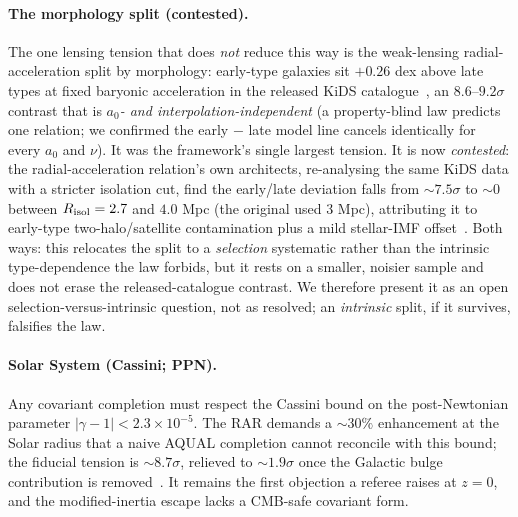 \documentclass[aps,prd,twocolumn,10pt,nofootinbib,superscriptaddress]{revtex4-2}
\begin{document}
\paragraph{The morphology split (contested).} The one lensing tension that does \emph{not} reduce this way is the
weak-lensing radial-acceleration split by morphology: early-type galaxies sit $+0.26$ dex above late types at fixed
baryonic acceleration in the released KiDS catalogue~\cite{Brouwer2021}, an $8.6$--$9.2\sigma$ contrast that is
\emph{$a_0$- and interpolation-independent} (a property-blind law predicts one relation; we confirmed the early
$-$ late model line cancels identically for every $a_0$ and $\nu$). It was the framework's single largest tension.
It is now \emph{contested}: the radial-acceleration relation's own architects, re-analysing the same KiDS data with
a stricter isolation cut, find the early/late deviation falls from $\sim7.5\sigma$ to $\sim0$ between $R_{\rm
isol}=2.7$ and $4.0$ Mpc (the original used $3$ Mpc), attributing it to early-type two-halo/satellite
contamination plus a mild stellar-IMF offset~\cite{Mistele2024}. Both ways: this relocates the split to a
\emph{selection} systematic rather than the intrinsic type-dependence the law forbids, but it rests on a smaller,
noisier sample and does not erase the released-catalogue contrast. We therefore present it as an open
selection-versus-intrinsic question, not as resolved; an \emph{intrinsic} split, if it survives, falsifies the
law.

\paragraph{Solar System (Cassini; PPN).} Any covariant completion must respect the Cassini bound on the
post-Newtonian parameter $|\gamma-1|<2.3\times10^{-5}$. The RAR demands a $\sim30\%$ enhancement at the Solar
radius that a naive AQUAL completion cannot reconcile with this bound; the fiducial tension is $\sim8.7\sigma$,
relieved to $\sim1.9\sigma$ once the Galactic bulge contribution is removed~\cite{Desmond2024}. It remains the first
objection a referee raises at $z\!=\!0$, and the modified-inertia escape lacks a CMB-safe covariant form.
\end{document}
